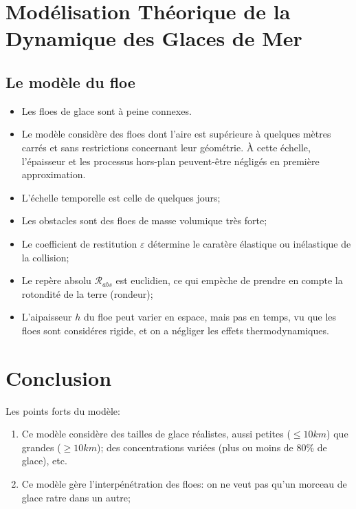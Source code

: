 \documentclass[
  french,
	11pt, %
]{fphw}
\begin{document}


\section{Modélisation Théorique de la Dynamique des Glaces de Mer}

\subsection{Le modèle du floe}


\begin{itemize}
  \item Les floes de glace sont à peine connexes. 
  \item Le modèle considère des floes dont l’aire est supérieure à quelques mètres carrés et sans restrictions concernant leur géométrie. À cette échelle, l’épaisseur et les processus hors-plan peuvent-être négligés en première approximation.
  \item L'échelle temporelle est celle de quelques jours;
  \item Les obstacles sont des floes de masse volumique très forte;
  \item Le coefficient de restitution $\varepsilon$ détermine le caratère élastique ou inélastique de la collision;
  \item Le repère absolu $\mathcal{R}_{abs}$ est euclidien, ce qui empèche de prendre en compte la rotondité de la terre (rondeur);
  \item L'aipaisseur $h$ du floe peut varier en espace, mais pas en temps, vu que les floes sont considéres rigide, et on a négliger les effets thermodynamiques.
\end{itemize}



\section*{Conclusion}

Les points forts du modèle:
\begin{enumerate}
  \item Ce modèle considère des tailles de glace réalistes, aussi petites ($\leq 10 km$) que grandes ($\geq 10 km$); des concentrations variées (plus ou moins de $80 \%$ de glace), etc.
  \item Ce modèle gère l'interpénétration des floes: on ne veut pas qu'un morceau de glace ratre dans un autre;
\end{enumerate}
\end{document}
